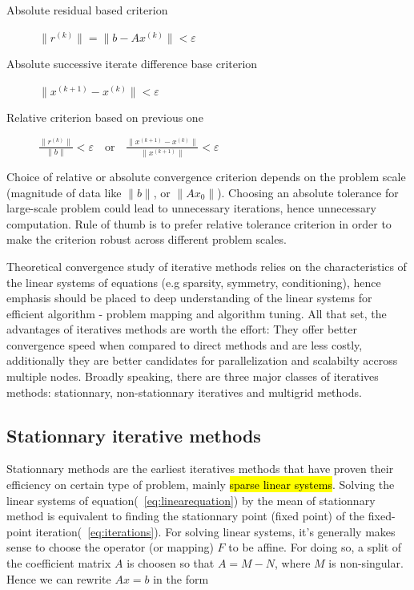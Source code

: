 \begin{description}
\item[Absolute residual based criterion] $\|r^{(k)}\| = \|b - A x^{(k)}\| < \varepsilon$
\item[Absolute successive iterate difference base criterion] $\|x^{(k+1)} - x^{(k)}\| < \varepsilon$
\item[Relative criterion based on previous one] $\frac{\|r^{(k)}\|}{\|b\|} < \varepsilon \quad \text{or} \quad \frac{\|x^{(k+1)} - x^{(k)}\|}{\|x^{(k+1)}\|} < \varepsilon$
\end{description}

Choice of relative or absolute convergence criterion depends on the problem scale (magnitude of data like $\|b\|$,
or $\|Ax_0\|$). Choosing an absolute tolerance for large-scale problem could lead to unnecessary iterations, hence    unnecessary computation. Rule of thumb is to prefer relative tolerance criterion in order to make the criterion robust across different problem scales. 

Theoretical convergence study of iterative methods relies on the characteristics of the linear systems of equations (e.g sparsity, symmetry, conditioning), hence emphasis should be placed to deep understanding of the linear systems for efficient algorithm - problem mapping and algorithm tuning. All that set, the advantages of iteratives methods are worth the effort: They offer better convergence speed when compared to direct methods and are less costly, additionally they are better candidates for parallelization and scalabilty accross multiple nodes.  Broadly speaking, there are three major classes of iteratives methods: stationnary, non-stationnary iteratives and multigrid methods.


\subsection{Stationnary iterative methods}
Stationnary methods are the earliest iteratives methods that have proven their efficiency on certain type of problem, mainly \hl{sparse linear systems}. Solving the linear systems of equation(~\ref{eq:linearequation}) by the mean of stationnary method is equivalent to finding the stationnary point (fixed point) of the fixed-point iteration(~\ref{eq:iterations}). For solving linear systems, it's generally makes sense to choose the operator (or mapping) $F$ to be affine. For doing so, a split of the coefficient matrix $A$ is choosen so that $A = M - N$, where $M$ is non-singular. Hence we can rewrite $Ax = b$ in the form

